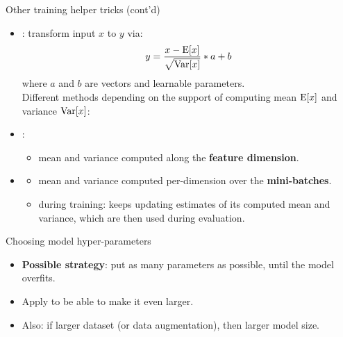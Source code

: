\begin{frame}[fragile]{Other training helper tricks (cont'd)}
\begin{itemize}
\item {}: transform input $x$ to $y$ via:
\[
y = \dfrac{x-\operatorname{E}[x]}{\sqrt{\operatorname{Var}[x]}} * a + b
\]
where $a$ and $b$ are vectors and learnable parameters.\\
Different methods depending on the support of computing mean $\operatorname{E}[x]$ and variance $\operatorname{Var}[x]$:
\vsp
\item {}: 
\begin{itemize}
\item mean and variance computed along the \textbf{feature dimension}.
\end{itemize}
\item {}
\begin{itemize}
\item mean and variance computed per-dimension over the \textbf{mini-batches}.
\item during training: keeps updating estimates of its computed mean and variance, which are then used during evaluation.
\end{itemize}
\end{itemize}
\end{frame}

\begin{frame}{Choosing model hyper-parameters}
\begin{itemize}
\item \textbf{Possible strategy}: put as many parameters as possible, until the model overfits.
\item Apply  to be able to make it even larger.
\item Also: if larger dataset (or data augmentation), then larger model size.
\end{itemize}
\end{frame}

